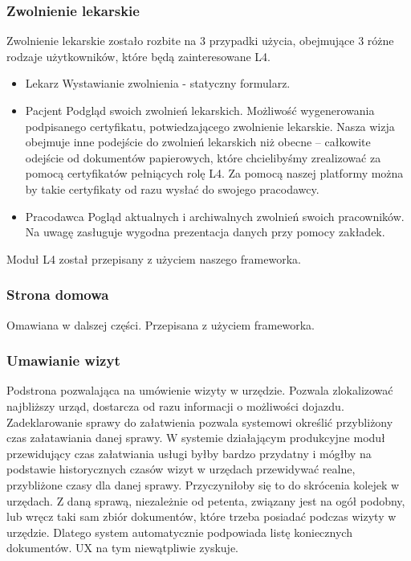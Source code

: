 \documentclass[licencjacka]{pracamgr}
\begin{document}
\subsubsection{Zwolnienie lekarskie}
Zwolnienie lekarskie zostało rozbite na 3 przypadki użycia, obejmujące 3 różne rodzaje użytkowników, które
będą zainteresowane L4.
\begin{itemize}
  \item Lekarz \newline
    Wystawianie zwolnienia - statyczny formularz.
  \item Pacjent \newline
    Podgląd swoich zwolnień lekarskich. Możliwość wygenerowania podpisanego certyfikatu, potwiedzającego
    zwolnienie lekarskie. Nasza wizja obejmuje inne podejście do zwolnień lekarskich niż obecne --
    całkowite odejście od dokumentów papierowych, które chcielibyśmy zrealizować za pomocą
    certyfikatów pełniących rolę L4. Za pomocą naszej platformy można by takie certyfikaty
    od razu wysłać do swojego pracodawcy.
  \item Pracodawca
    Pogląd aktualnych i archiwalnych zwolnień swoich pracowników. Na uwagę zasługuje wygodna prezentacja danych
    przy pomocy zakładek.
\end{itemize}
Moduł L4 został przepisany z użyciem naszego frameworka.
\subsubsection{Strona domowa}
Omawiana w dalszej części. Przepisana z użyciem frameworka.

\subsubsection{Umawianie wizyt}
Podstrona pozwalająca na umówienie wizyty w urzędzie. Pozwala zlokalizować najbliższy urząd,
dostarcza od razu informacji o możliwości dojazdu. Zadeklarowanie sprawy do załatwienia pozwala
systemowi określić przybliżony czas załatawiania danej sprawy. W systemie działającym produkcyjne
moduł przewidujący czas załatwiania usługi byłby bardzo przydatny i mógłby na podstawie historycznych czasów
wizyt w urzędach przewidywać realne, przybliżone czasy dla danej sprawy. Przyczyniłoby się to
do skrócenia kolejek w urzędach. Z daną sprawą, niezależnie od petenta, związany jest na ogół podobny,
lub wręcz taki sam zbiór dokumentów, które trzeba posiadać podczas wizyty w urzędzie. Dlatego system automatycznie
podpowiada listę koniecznych dokumentów. UX na tym niewątpliwie zyskuje.
\end{document}
